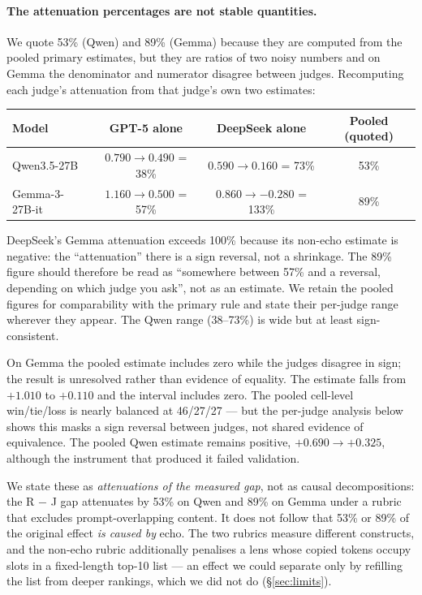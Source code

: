 \documentclass[11pt]{article}
\newcommand{\flag}[1]{\textcolor{flagged}{#1}}
\begin{document}
\paragraph{\flag{The attenuation percentages are not stable quantities.}} We
quote 53\% (Qwen) and 89\% (Gemma) because they are computed from the pooled
primary estimates, but they are ratios of two noisy numbers and on Gemma the
denominator and numerator disagree between judges. Recomputing each judge's
attenuation from that judge's own two estimates:

\begin{center}\small
\begin{tabular}{lccc}
\toprule
Model & GPT-5 alone & DeepSeek alone & Pooled (quoted) \\
\midrule
Qwen3.5-27B & $0.790 \to 0.490$ = 38\% & $0.590 \to 0.160$ = 73\% & 53\% \\
Gemma-3-27B-it & $1.160 \to 0.500$ = 57\% & \flag{$0.860 \to -0.280$ = 133\%} & 89\% \\
\bottomrule
\end{tabular}
\end{center}

\noindent DeepSeek's Gemma attenuation exceeds 100\% because its non-echo
estimate is negative: the ``attenuation'' there is a sign reversal, not a
shrinkage. \flag{The 89\% figure should therefore be read as ``somewhere between
57\% and a reversal, depending on which judge you ask'', not as an estimate.} We
retain the pooled figures for comparability with the primary rule and state their
per-judge range wherever they appear. The Qwen range (38--73\%) is wide but at
least sign-consistent.

\flag{On Gemma the pooled estimate includes zero while the judges disagree in
sign; the result is unresolved rather than evidence of equality.} The estimate
falls from $+1.010$ to $+0.110$ and the interval includes zero. The pooled
cell-level win/tie/loss is nearly balanced at 46/27/27 --- but the per-judge
analysis below shows this masks a sign reversal between judges, not shared
evidence of equivalence. The pooled Qwen estimate remains
positive, $+0.690 \to +0.325$, although the instrument that produced it failed
validation.

We state these as \emph{attenuations of the measured gap}, not as causal
decompositions: the R $-$ J gap attenuates by 53\% on Qwen and 89\% on Gemma
under a rubric that excludes prompt-overlapping content. It does not follow that
53\% or 89\% of the original effect \emph{is caused by} echo. The two rubrics
measure different constructs, and the non-echo rubric additionally penalises a
lens whose copied tokens occupy slots in a fixed-length top-10 list --- an
effect we could separate only by refilling the list from deeper rankings, which
we did not do (\S\ref{sec:limits}).
\end{document}
